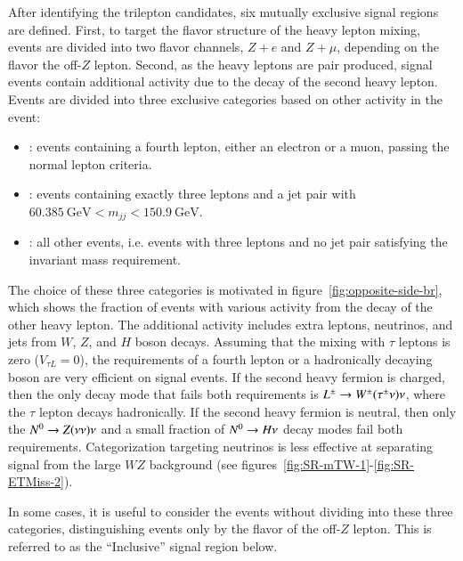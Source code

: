 After identifying the trilepton candidates, six mutually exclusive signal regions are defined. First, to target the flavor structure of the heavy lepton mixing, events are divided into two flavor channels, $Z+e$ and $Z+\mu$, depending on the flavor the off-$Z$ lepton. Second, as the heavy leptons are pair produced, signal events contain additional activity due to the decay of the second heavy lepton. Events are divided into three exclusive categories based on other activity in the event:
  \begin{itemize}
  	\item \textbf{\fourl}: events containing a fourth lepton, either an electron or a muon, passing the normal lepton criteria. 
  	\item \textbf{\threeljj}: events containing exactly three leptons and a jet pair with $60.385~\mbox{GeV}<m_{jj}<150.9~\mbox{GeV}$. 
  	\item \textbf{\threelo}: all other events, i.e. events with three leptons and no jet pair satisfying the invariant mass requirement. 
  \end{itemize}

 The choice of these three categories is motivated in figure~\ref{fig:opposite-side-br}, which shows the fraction of events with various activity from the decay of the other heavy lepton. The additional activity includes extra leptons, neutrinos, and jets from $W$, $Z$, and $H$ boson decays. Assuming that the mixing with $\tau$ leptons is zero ($V_{\tau L}=0$), the requirements of a fourth lepton or a hadronically decaying boson are very efficient on signal events. If the second heavy fermion is charged, then the only decay mode that fails both requirements is $L^{\pm}\rightarrow W^{\pm}(\tau^{\pm}\nu)\nu$, where the $\tau$ lepton decays hadronically. If the second heavy fermion is neutral, then only the $N^{0}\rightarrow Z(\nu\nu)\nu$ and a small fraction of $N^{0} \rightarrow H\nu$ decay modes fail both requirements. Categorization targeting neutrinos is less effective at separating signal from the large $WZ$ background (see figures~\ref{fig:SR-mTW-1}-\ref{fig:SR-ETMiss-2}). 

In some cases, it is useful to consider the events without dividing into these three categories, distinguishing events only by the flavor of the off-$Z$ lepton. This is referred to as the ``Inclusive'' signal region below.

